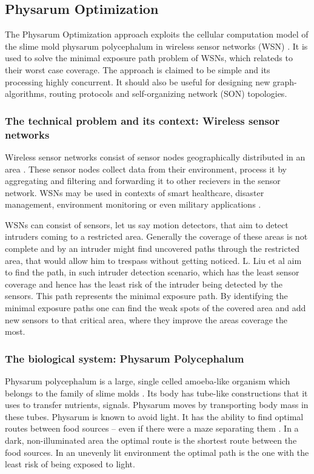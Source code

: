 \documentclass{IWORK2014}
\begin{document}
\subsection{Physarum Optimization}
The Physarum Optimization approach exploits the cellular computation model of the slime mold physarum polycephalum in wireless sensor networks (WSN) \cite{liu2012physarum}. It is used to solve the minimal exposure path problem of WSNs, which relateds to their worst case coverage. The approach is claimed to be simple and its processing highly concurrent. It should also be useful for designing new graph-algorithms, routing protocols and self-organizing network (SON) topologies.

\subsubsection{The technical problem and its context: Wireless sensor networks}
Wireless sensor networks consist of sensor nodes geographically distributed in an area \cite{nazi2013robust}. These sensor nodes collect data from their environment, process it by aggregating and filtering and forwarding it to other recievers in the sensor network. WSNs may be used in contexts of smart healthcare, disaster management, environment monitoring \cite{nazi2013robust} or even military applications \cite{liu2012physarum}.

WSNs can consist of sensors, let us say motion detectors, that aim to detect intruders coming to a restricted area. Generally the coverage of these areas is not complete and by an intruder might find uncovered paths through the restricted area, that would allow him to trespass without getting noticed. L. Liu et al \cite{liu2012physarum} aim to find the path, in such intruder detection scenario, which has the least sensor coverage and hence has the least risk of the intruder being detected by the sensors. This path represents the minimal exposure path. By identifying the minimal exposure paths one can find the weak spots of the covered area and add new sensors to that critical area, where they improve the areas coverage the most.

\subsubsection{The biological system: Physarum Polycephalum}
Physarum polycephalum is a large, single celled amoeba-like organism which belongs to the family of slime molds \cite{liu2012physarum}. Its body has tube-like constructions that it uses to transfer nutrients, signals. Physarum moves by transporting body mass in these tubes. Physarum is known to avoid light. It has the ability to find optimal routes between food sources -- even if there were a maze separating them \cite{nakagaki2000intelligence}. In a dark, non-illuminated area the optimal route is the shortest route between the food sources. In an unevenly lit environment the optimal path is the one with the least risk of being exposed to light.
\end{document}
